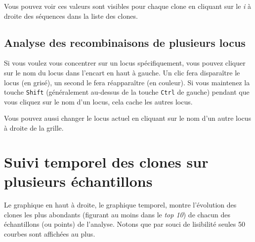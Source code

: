 \documentclass[10pt]{article}
\begin{document}
{Vous pouvez voir ces valeurs sont visibles pour chaque clone en cliquant
sur le \textit{i} à droite des séquences dans la liste des clones.

\subsection{Analyse des recombinaisons de plusieurs locus}

Si vous voulez vous concentrer sur un locus spécifiquement, vous pouvez
cliquer sur le nom du locus dans l'encart en haut à gauche. Un clic fera
disparaître le locus (en grisé), un second le fera réapparaître (en
couleur). Si vous maintenez la touche \texttt{Shift} (généralement au-dessus de
la touche \texttt{Ctrl} de gauche) pendant que vous cliquez sur le nom d'un
locus, cela cache les autres locus.


Vous pouvez aussi changer le locus actuel en cliquant sur le nom d'un
autre locus à droite de la grille.

\newpage

\section{Suivi temporel des clones sur plusieurs échantillons}
\label{sec:tracking}


Le graphique en haut à droite, le graphique temporel, montre l'évolution des
clones les plus abondants (figurant au moins dans le \textit{top 10}) de chacun des
échantillons (ou points) de l'analyse.
Notons que par souci de lisibilité seules 50 courbes sont affichées au plus.


}
\end{document}
